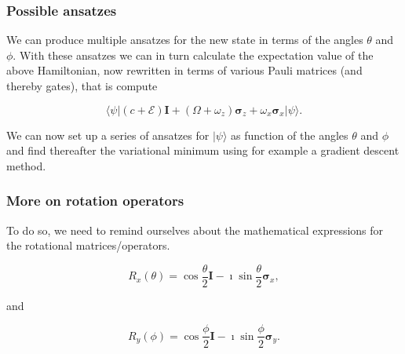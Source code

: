 \documentclass{beamer}
\begin{document}
\begin{frame}
\frametitle{Possible ansatzes}

We can produce multiple ansatzes for the new state in terms of the
angles $\theta$ and $\phi$.  With these ansatzes we can in turn
calculate the expectation value of the above Hamiltonian, now
rewritten in terms of various Pauli matrices (and thereby gates), that is compute

\[
\langle \psi \vert (c+\mathcal{E})\bm{I} + (\Omega+\omega_z)\bm{\sigma}_z + \omega_x\bm{\sigma}_x\vert \psi \rangle.
\]

We can now set up a series of ansatzes for $\vert \psi \rangle$ as
function of the angles $\theta$ and $\phi$ and find thereafter the
variational minimum using for example a gradient descent method.
\end{frame}

\begin{frame}
\frametitle{More on rotation operators}

To do so, we need to remind ourselves about the mathematical expressions for
the rotational matrices/operators.

\[
R_x(\theta)=\cos{\frac{\theta}{2}}\bm{I}-\imath \sin{\frac{\theta}{2}}\bm{\sigma}_x,
\]

and

\[
R_y(\phi)=\cos{\frac{\phi}{2}}\bm{I}-\imath \sin{\frac{\phi}{2}}\bm{\sigma}_y.
\]
\end{frame}
\end{document}
